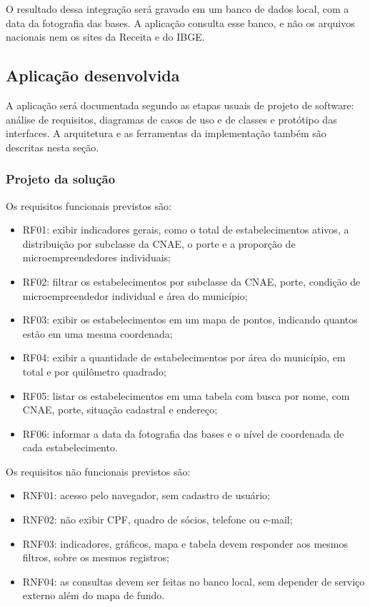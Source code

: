 O resultado dessa integração será gravado em um banco de dados local, com a data da fotografia das bases.
A aplicação consulta esse banco, e não os arquivos nacionais nem os sites da Receita e do IBGE.

\subsection{Aplicação desenvolvida}

A aplicação será documentada segundo as etapas usuais de projeto de software: análise de requisitos, diagramas de casos de uso e de classes e protótipo das interfaces.
A arquitetura e as ferramentas da implementação também são descritas nesta seção.

\subsubsection{Projeto da solução}

Os requisitos funcionais previstos são:

\begin{itemize}
    \item RF01: exibir indicadores gerais, como o total de estabelecimentos ativos, a distribuição por subclasse da CNAE, o porte e a proporção de microempreendedores individuais;
    \item RF02: filtrar os estabelecimentos por subclasse da CNAE, porte, condição de microempreendedor individual e área do município;
    \item RF03: exibir os estabelecimentos em um mapa de pontos, indicando quantos estão em uma mesma coordenada;
    \item RF04: exibir a quantidade de estabelecimentos por área do município, em total e por quilômetro quadrado;
    \item RF05: listar os estabelecimentos em uma tabela com busca por nome, com CNAE, porte, situação cadastral e endereço;
    \item RF06: informar a data da fotografia das bases e o nível de coordenada de cada estabelecimento.
\end{itemize}

Os requisitos não funcionais previstos são:

\begin{itemize}
    \item RNF01: acesso pelo navegador, sem cadastro de usuário;
    \item RNF02: não exibir CPF, quadro de sócios, telefone ou e-mail;
    \item RNF03: indicadores, gráficos, mapa e tabela devem responder aos mesmos filtros, sobre os mesmos registros;
    \item RNF04: as consultas devem ser feitas no banco local, sem depender de serviço externo além do mapa de fundo.
\end{itemize}


